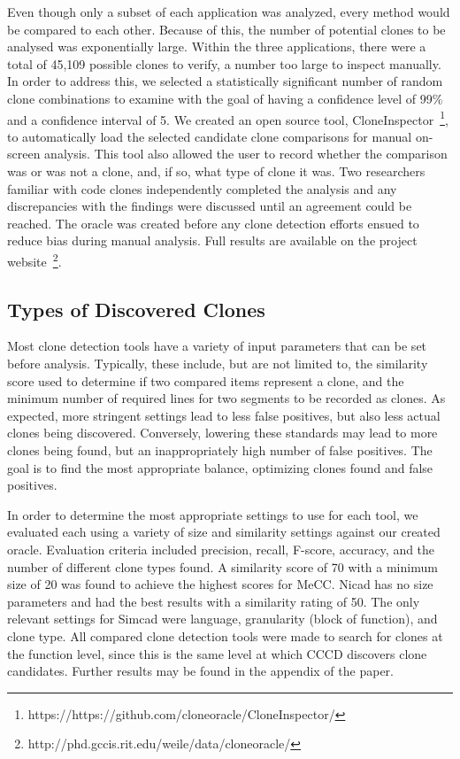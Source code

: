 \documentclass[smallextended]{svjour3}       %
\begin{document}
Even though only a subset of each application was analyzed, every method would be compared to each other. Because of this, the number of potential clones to be analysed was exponentially large. Within the three applications, there were a total of 45,109 possible clones to verify, a number too large to inspect manually. In order to address this, we selected a statistically significant number of random clone combinations to examine with the goal of having a confidence level of 99\% and a confidence interval of 5. We created an open source tool, CloneInspector~\footnote{https://https://github.com/cloneoracle/CloneInspector/}, to automatically load the selected candidate clone comparisons for manual on-screen analysis. This tool also allowed the user to record whether the comparison was or was not a clone, and, if so, what type of clone it was. Two researchers familiar with code clones independently completed the analysis and any discrepancies with the findings were discussed until an agreement could be reached. The oracle was created before any clone detection efforts ensued to reduce bias during manual analysis. Full results are available on the project website~\footnote{http://phd.gccis.rit.edu/weile/data/cloneoracle/}.


\subsection{Types of Discovered Clones}

Most clone detection tools have a variety of input parameters that can be set before analysis. Typically, these include, but are not limited to, the similarity score used to determine if two compared items represent a clone, and the minimum number of required lines for two segments to be recorded as clones. As expected, more stringent settings lead to less false positives, but also less actual clones being discovered. Conversely, lowering these standards may lead to more clones being found, but an inappropriately high number of false positives. The goal is to find the most appropriate balance, optimizing clones found and false positives.

In order to determine the most appropriate settings to use for each tool, we evaluated each using a variety of size and similarity settings against our created oracle. Evaluation criteria included precision, recall, F-score, accuracy, and the number of different clone types found. A similarity score of 70 with a minimum size of 20 was found to achieve the highest scores for MeCC. Nicad has no size parameters and had the best results with a similarity rating of 50. The only relevant settings for Simcad were language, granularity (block of function), and clone type. All compared clone detection tools were made to search for clones at the function level, since this is the same level at which CCCD discovers clone candidates. Further results may be found in the appendix of the paper.
\end{document}
